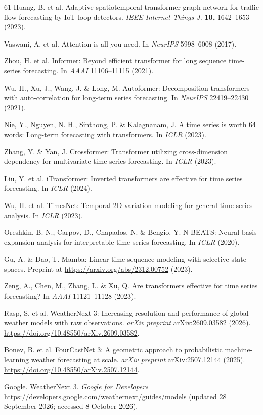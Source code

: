 \documentclass[fleqn,10pt]{wlscirep}
\begin{document}
\begin{thebibliography}{61}
Huang, B. et al. Adaptive spatiotemporal transformer graph network for
  traffic flow forecasting by IoT loop detectors. \textit{IEEE Internet
  Things J.} \textbf{10,} 1642--1653 (2023).

Vaswani, A. et al. Attention is all you need. In \textit{NeurIPS}
  5998--6008 (2017).

Zhou, H. et al. Informer: Beyond efficient transformer for long sequence
  time-series forecasting. In \textit{AAAI} 11106--11115 (2021).

Wu, H., Xu, J., Wang, J. \& Long, M. Autoformer: Decomposition
  transformers with auto-correlation for long-term series forecasting. In
  \textit{NeurIPS} 22419--22430 (2021).

Nie, Y., Nguyen, N. H., Sinthong, P. \& Kalagnanam, J. A time series is
  worth 64 words: Long-term forecasting with transformers. In \textit{ICLR}
  (2023).

Zhang, Y. \& Yan, J. Crossformer: Transformer utilizing cross-dimension
  dependency for multivariate time series forecasting. In \textit{ICLR}
  (2023).

Liu, Y. et al. iTransformer: Inverted transformers are effective for time
  series forecasting. In \textit{ICLR} (2024).

Wu, H. et al. TimesNet: Temporal 2D-variation modeling for general time
  series analysis. In \textit{ICLR} (2023).

Oreshkin, B. N., Carpov, D., Chapados, N. \& Bengio, Y. N-BEATS: Neural
  basis expansion analysis for interpretable time series forecasting. In
  \textit{ICLR} (2020).

Gu, A. \& Dao, T. Mamba: Linear-time sequence modeling with selective
  state spaces. Preprint at \url{https://arxiv.org/abs/2312.00752} (2023).

Zeng, A., Chen, M., Zhang, L. \& Xu, Q. Are transformers effective for
  time series forecasting? In \textit{AAAI} 11121--11128 (2023).

Rasp, S. et al. WeatherNext 3: Increasing resolution and performance of
global weather models with raw observations. \textit{arXiv preprint}
arXiv:2609.03582 (2026). \url{https://doi.org/10.48550/arXiv.2609.03582}.

Bonev, B. et al. FourCastNet 3: A geometric approach to probabilistic
machine-learning weather forecasting at scale. \textit{arXiv preprint}
arXiv:2507.12144 (2025). \url{https://doi.org/10.48550/arXiv.2507.12144}.

Google. WeatherNext 3. \textit{Google for Developers}
\url{https://developers.google.com/weathernext/guides/models}
(updated 28 September 2026; accessed 8 October 2026).

\end{thebibliography}
\end{document}
